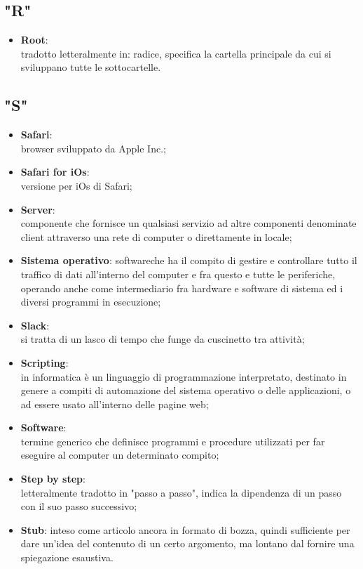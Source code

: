 \subsection{"R"}
\begin{itemize}
\item \textbf{Root}:\\ tradotto letteralmente in: radice, specifica la cartella principale da cui si sviluppano tutte le sottocartelle.
\end{itemize}
\subsection{"S"}
\begin{itemize}
\item \textbf{Safari}:\\ browser sviluppato da Apple Inc.;
\item \textbf{Safari for iOs}:\\ versione per iOs di Safari;
\item \textbf{Server}:\\ componente che fornisce un qualsiasi servizio ad altre componenti denominate client attraverso una rete di computer o direttamente in locale;
\item \textbf{Sistema operativo}: software\ped che ha il compito di gestire e controllare tutto il traffico di dati all’interno del computer e fra questo e tutte le periferiche, operando anche come intermediario fra hardware e software di sistema ed i diversi programmi in esecuzione;
\item \textbf{Slack}:\\ si tratta di un lasco di tempo che funge da cuscinetto tra attività;
\item \textbf{Scripting}:\\ in informatica è un linguaggio di programmazione interpretato, destinato in genere a compiti di automazione del sistema operativo o delle applicazioni, o ad essere usato all'interno delle pagine web;
\item \textbf{Software}:\\ termine generico che definisce programmi e procedure utilizzati per far eseguire al computer un determinato compito;
\item \textbf{Step by step}:\\ letteralmente tradotto in "passo a passo", indica la dipendenza di un passo con il suo passo successivo;
\item \textbf{Stub}: inteso come articolo ancora in formato di bozza, quindi sufficiente per dare un'idea del contenuto di un certo argomento, ma lontano dal fornire una spiegazione esaustiva.
\end{itemize} 

